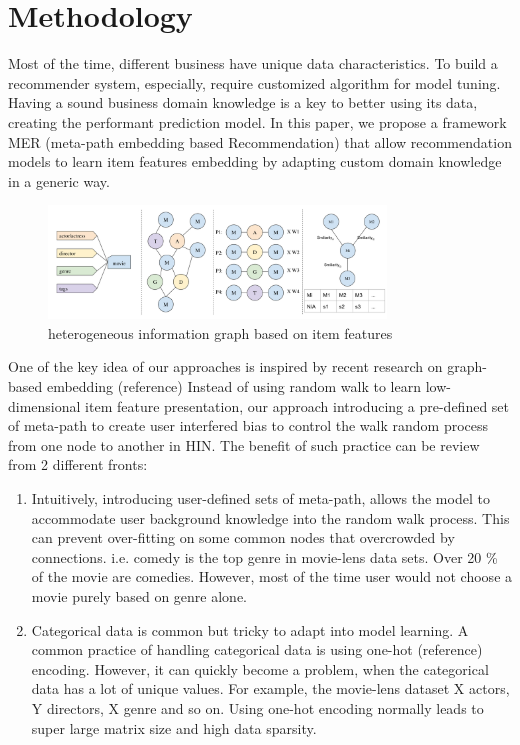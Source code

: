 \section{Methodology}
Most of the time, different business have unique data characteristics. To build a recommender system, especially, require customized algorithm for model tuning.  Having a sound business domain knowledge is a key to better using its data, creating the performant prediction model. In this paper, we propose a framework MER (meta-path embedding based Recommendation) that allow recommendation models to learn item features embedding by adapting custom domain knowledge in a generic way. 

\begin{figure}[!t]
    \centering
    \includegraphics[width=0.8\textwidth]{figs/fig1.png}
    \caption{heterogeneous information graph based on item features}\label{fig:fe-graph}
\end{figure}

One of the key idea of our approaches is inspired by recent research on graph-based embedding (reference) Instead of using random walk to learn low-dimensional item feature presentation, our approach introducing a pre-defined set of meta-path to create user interfered bias to control the walk random process from one node to another in HIN. The benefit of such practice can be review from 2 different fronts: 

\begin{enumerate}
    \item Intuitively, introducing user-defined sets of meta-path, allows the model to accommodate user background knowledge into the random walk process. This can prevent over-fitting on some common nodes that overcrowded by connections. i.e. comedy is the top genre in movie-lens data sets. Over 20 \% of the movie are comedies. However, most of the time user would not choose a movie purely based on genre alone.
    \item Categorical data is common but tricky to adapt into model learning. A common practice of handling categorical data is using one-hot (reference) encoding. However, it can quickly become a problem, when the categorical data has a lot of unique values. For example, the movie-lens dataset X actors, Y directors, X genre and so on. Using one-hot encoding normally leads to super large matrix size and high data sparsity.
\end{enumerate}

